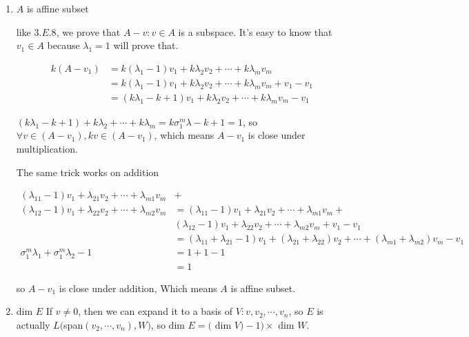 \begin{enumerate}[label=(\alph*)]
\item $A$ is affine subset

like $3.E.8$, we prove that $A-v: v\in A$ is a subspace. It's easy to know that $v_{1} \in A$ because $\lambda_{1} = 1$ will prove that.

\begin{equation*}
    \begin{split}
    k (A-v_{1}) &= k(\lambda_{1} - 1)v_{1} + k\lambda_{2}v_{2} + \cdots + k\lambda_{m}v_{m} \\
    &= k(\lambda_{1} - 1)v_{1} + k\lambda_{2}v_{2} + \cdots + k\lambda_{m}v_{m} + v_{1} - v_{1} \\
    &= (k\lambda_{1} - k + 1)v_{1} + k\lambda_{2}v_{2} + \cdots + k\lambda_{m}v_{m}  - v_{1}
    \end{split}
\end{equation*}

$(k\lambda_{1} - k + 1) + k\lambda_{2} + \cdots + k\lambda_{m} = k\sigma_{1}^{m}\lambda - k + 1 = 1$, 
so $\forall v \in (A-v_{1}), kv \in (A-v_{1})$, which means $A-v_{1}$ is close under multiplication.

The same trick works on addition

\begin{equation*}
    \begin{split}
    (\lambda_{11} - 1)v_{1} + \lambda_{21}v_{2} + \cdots + \lambda_{m1}v_{m} &+ \\
    (\lambda_{12} - 1)v_{1} + \lambda_{22}v_{2} + \cdots + \lambda_{m2}v_{m} &= (\lambda_{11} - 1)v_{1} + \lambda_{21}v_{2} + \cdots + \lambda_{m1}v_{m} +\\
    & (\lambda_{12} - 1)v_{1} + \lambda_{22}v_{2} + \cdots + \lambda_{m2}v_{m} + v_{1} - v_{1} \\
    &= (\lambda_{11} + \lambda_{21} - 1)v_{1} + (\lambda_{21}+\lambda_{22})v_{2} + \cdots + (\lambda_{m1}+\lambda_{m2})v_{m} - v_{1} \\
    \sigma_{1}^{m}\lambda_{1} + \sigma_{1}^{m}\lambda_{2} - 1 &= 1 + 1 - 1 \\
    &= 1
    \end{split}
\end{equation*}

so $A-v_{1}$ is close under addition, Which means $A$ is affine subset.


\item dim $E$
If $v\neq 0$, then we can expand it to a basis of $V: v, v_{2},\cdots, v_{n}$, so $E$ is actually $L($span$(v_{2}, \cdots, v_{n}), W)$, so 
dim $E = ($ dim $V) - 1) \times $ dim $W$.
\end{enumerate}
\newpage
